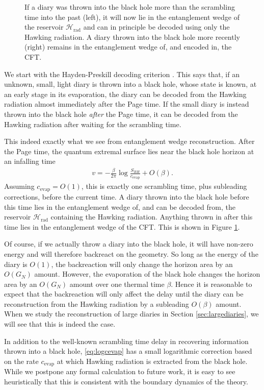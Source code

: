 \documentclass[11pt,a4paper]{article}
\begin{document}
\begin{figure}[t]
\caption{If a diary was thrown into the black hole more than the scrambling time into the past (left), it will now lie in the entanglement wedge of the reservoir $\mathcal{H}_\text{rad}$ and can in principle be decoded using only the Hawking radiation. A diary thrown into the black hole more recently (right) remains in the entanglement wedge of, and encoded in, the CFT.}
\label{fig:haydenpreskill}
\end{figure}

We start with the Hayden-Preskill decoding criterion \cite{hayden2007black}. This says that, if an unknown, small, light diary is thrown into a black hole, whose state is known, at an early stage in its evaporation, the diary can be decoded from the Hawking radiation almost immediately after the Page time. If the small diary is instead thrown into the black hole \emph{after} the Page time, it can be decoded from the Hawking radiation after waiting for the scrambling time.

This indeed exactly what we see from entanglement wedge reconstruction. After the Page time, the quantum extremal surface lies near the black hole horizon at an infalling time
\begin{align} \label{eq:logcevap}
v = - \frac{\beta}{2 \pi} \log \frac{S_{BH}}{c_\text{evap}} + O(\beta).
\end{align}
Assuming $c_\text{evap} = O(1)$, this is exactly one scrambling time, plus subleading corrections, before the current time. A diary thrown into the black hole before this time lies in the entanglement wedge of, and can be decoded from, the reservoir $\mathcal{H}_\text{rad}$ containing the Hawking radiation. Anything thrown in after this time lies in the entanglement wedge of the CFT. This is shown in Figure \ref{fig:haydenpreskill}.

Of course, if we actually throw a diary into the black hole, it will have non-zero energy and will therefore backreact on the geometry. So long as the energy of the diary is $O(1)$, the backreaction will only change the horizon area by an $O(G_N)$ amount. However, the evaporation of the black hole changes the horizon area by an $O(G_N)$ amount over one thermal time $\beta$. Hence it is reasonable to expect that the backreaction will only affect the delay until the diary can be reconstruction from the Hawking radiation by a subleading $O(\beta)$ amount.
When we study the reconstruction of large diaries in Section \ref{sec:largediaries}, we will see that this is indeed the case.

In addition to the well-known scrambling time delay in recovering information thrown into a black hole, \eqref{eq:logcevap} has a small logarithmic correction based on the rate $c_\text{evap}$ at which Hawking radiation is extracted from the black hole. 
While we postpone any formal calculation to future work, it is easy to see heuristically that this is consistent with the boundary dynamics of the theory. 
\end{document}
